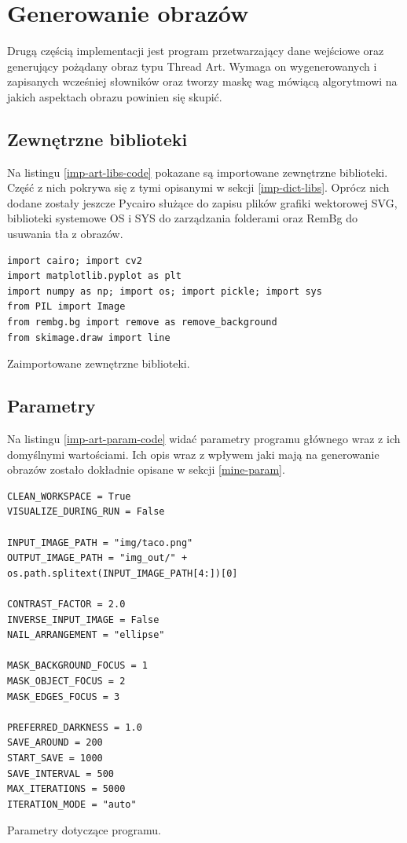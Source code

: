     \section{Generowanie obrazów} \label{imp-art}
    Drugą częścią implementacji jest program przetwarzający dane wejściowe oraz generujący pożądany obraz typu Thread Art. Wymaga on wygenerowanych i zapisanych wcześniej słowników oraz tworzy maskę wag mówiącą algorytmowi na jakich aspektach obrazu powinien się skupić.
        \subsection{Zewnętrzne biblioteki} \label{imp-art-libs}
        Na listingu \ref{imp-art-libs-code} pokazane są importowane zewnętrzne biblioteki. Część z nich pokrywa się z tymi opisanymi w sekcji \ref{imp-dict-libs}.  Oprócz nich dodane zostały jeszcze Pycairo służące do zapisu plików grafiki wektorowej SVG, biblioteki systemowe OS i SYS do zarządzania folderami oraz RemBg do usuwania tła z obrazów.
        \begin{code}[htb]
        \begin{verbatim}
import cairo; import cv2
import matplotlib.pyplot as plt
import numpy as np; import os; import pickle; import sys
from PIL import Image
from rembg.bg import remove as remove_background
from skimage.draw import line
        \end{verbatim}
        \caption{Zaimportowane zewnętrzne biblioteki.}
        \label{imp-art-libs-code}
        \end{code}
        
        \subsection{Parametry} \label{imp-art-param}
        Na listingu \ref{imp-art-param-code} widać parametry programu głównego wraz z ich domyślnymi wartościami. Ich opis wraz z wpływem jaki mają na generowanie obrazów zostało dokładnie opisane w sekcji \ref{mine-param}.
        \begin{code}[H]
        \begin{verbatim}
CLEAN_WORKSPACE = True
VISUALIZE_DURING_RUN = False

INPUT_IMAGE_PATH = "img/taco.png"
OUTPUT_IMAGE_PATH = "img_out/" + os.path.splitext(INPUT_IMAGE_PATH[4:])[0]

CONTRAST_FACTOR = 2.0
INVERSE_INPUT_IMAGE = False
NAIL_ARRANGEMENT = "ellipse"

MASK_BACKGROUND_FOCUS = 1
MASK_OBJECT_FOCUS = 2
MASK_EDGES_FOCUS = 3

PREFERRED_DARKNESS = 1.0
SAVE_AROUND = 200 
START_SAVE = 1000
SAVE_INTERVAL = 500 
MAX_ITERATIONS = 5000 
ITERATION_MODE = "auto" 
        \end{verbatim}
        \caption{Parametry dotyczące programu.}
        \label{imp-art-param-code}
        \end{code}
        

